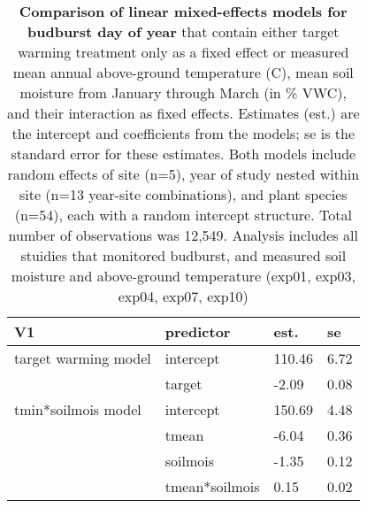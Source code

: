 \documentclass{article}
\begin{document}
\begin{table}[ht]
\centering
\caption{\textbf{Comparison of linear mixed-effects models for budburst day of year} that contain either target warming treatment only as a fixed effect or measured mean annual above-ground temperature (\degree C), mean soil moisture from January through March (in \% VWC), and their interaction as fixed effects. Estimates (est.) are the intercept and coefficients from the models; se is the standard error for these estimates. Both models include random effects of site (n=5), year of study nested within site (n=13 year-site combinations), and plant species (n=54), each with a random intercept structure. Total number of observations was 12,549. Analysis includes all stuidies that monitored budburst, and measured soil moisture and above-ground temperature (exp01, exp03, exp04, exp07, exp10)} 
\label{table:bbmods}
\begingroup\footnotesize
\begin{tabular}{|p{}|p{}|p{}|p{}|}
  \hline
V1 & predictor & est. & se \\ 
  \hline
target warming model & intercept & 110.46 & 6.72 \\ 
   & target & -2.09 & 0.08 \\ 
   \hline
tmin*soilmois model & intercept & 150.69 & 4.48 \\ 
   & tmean & -6.04 & 0.36 \\ 
   & soilmois & -1.35 & 0.12 \\ 
   & tmean*soilmois & 0.15 & 0.02 \\ 
   \hline
\end{tabular}
\endgroup
\end{table}
\end{document}

